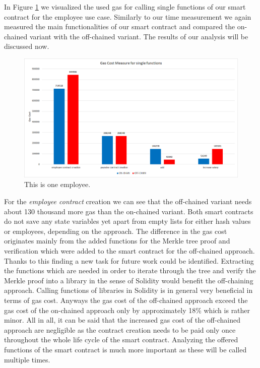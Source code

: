 In Figure \ref{fig:05_gas_cost_single} we visualized the used gas for calling single functions of our smart contract for the employee use case.
Similarly to our time measurement we again measured the main functionalities of our smart contract and compared the on-chained variant with the off-chained variant.
The results of our analysis will be discussed now.

\begin{figure}[t]
\centering
\includegraphics[width=1.0\textwidth]{images/05_evaluation/05_gas_cost_single.png}
\caption{\label{fig:05_gas_cost_single}This is one employee.}
\end{figure}

For the \textit{employee contract} creation we can see that the off-chained variant needs about 130 thousand more gas than the on-chained variant.
Both smart contracts do not save any state variables yet apart from empty lists for either hash values or employees, depending on the approach.
The difference in the gas cost originates mainly from the added functions for the Merkle tree proof and verification which were added to the smart contract for the off-chained approach.
Thanks to this finding a new task for future work could be identified.
Extracting the functions which are needed in order to iterate through the tree and verify the Merkle proof into a library in the sense of Solidity would benefit the off-chaining approach.
Calling functions of libraries in Solidity is in general very beneficial in terms of gas cost.
Anyways the gas cost of the off-chained approach exceed the gas cost of the on-chained approach only by approximately 18\% which is rather minor.
All in all, it can be said that the increased gas cost of the off-chained approach are negligible as the contract creation needs to be paid only once throughout the whole life cycle of the smart contract.
Analyzing the offered functions of the smart contract is much more important as these will be called multiple times.

